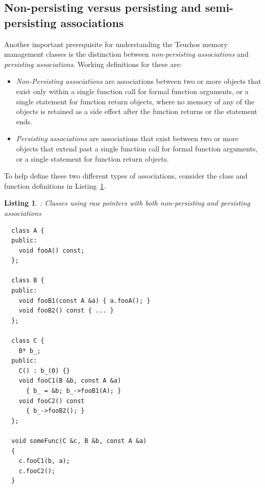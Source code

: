 \documentclass[pdf,ps2pdf,11pt]{SANDreport}
\newtheorem{listing}{Listing}
\begin{document}
%
{}\subsection{Non-persisting versus persisting and semi-persisting
associations}
\label{sec:nonpersisting-persisting-associations}
%

Another important prerequisite for understanding the Teuchos memory
management classes is the distinction between {}\textit{non-persisting
associations} and {}\textit{persisting associations}.  Working
definitions for these are:

\begin{itemize}

{}\item\textit{Non-Persisting associations} are associations between
two or more objects that exist only within a single function call for
formal function arguments, or a single statement for function return
objects, where no memory of any of the objects is retained as a side
effect after the function returns or the statement ends.

{}\item\textit{Persisting associations} are associations that exist
between two or more objects that extend past a single function call
for formal function arguments, or a single statement for function
return objects.

\end{itemize}

To help define these two different types of associations, consider the
class and function definitions in
Listing~\ref{listing:NonPersistingPersistingAssociationsRawPointers}.


{}\begin{listing}: Classes using raw pointers with both non-persisting
and persisting associations
\label{listing:NonPersistingPersistingAssociationsRawPointers}
{\small\begin{verbatim}
  class A {
  public:
    void fooA() const;
  };

  class B {
  public:
    void fooB1(const A &a) { a.fooA(); }
    void fooB2() const { ... }
  };

  class C {
    B* b_;    
  public:
    C() : b_(0) {}
    void fooC1(B &b, const A &a)
      { b_ = &b; b_->fooB1(A); }
    void fooC2() const
      { b_->fooB2(); }
  };

  void someFunc(C &c, B &b, const A &a)
  {
    c.fooC1(b, a);
    c.fooC2();
  }
\end{verbatim}}
\end{listing}
\end{document}
